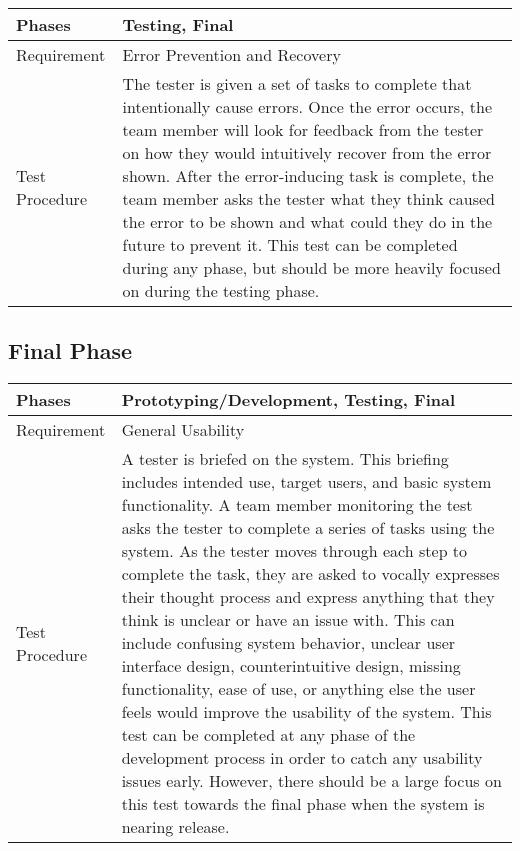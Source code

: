 \documentclass{article}
\begin{document}
\begin{tabular}{| l | p{12cm}  |}
    \hline
	Phases & Testing, Final \\ \hline
	Requirement & Error Prevention and Recovery \\ \hline
	Test Procedure & The tester is given a set of tasks to complete that
	intentionally cause errors. Once the error occurs, the team member will
	look for feedback from the tester on how they would intuitively recover
	from the error shown. After the error-inducing task is complete, the team
	member asks the tester what they think caused the error to be shown and
	what could they do in the future to prevent it. This test can be completed
	during any phase, but should be more heavily focused on during the testing
	phase. \\ \hline
\end{tabular}

\subsection{Final Phase}
\begin{tabular}{| l | p{12cm}  |}
    \hline
	Phases & Prototyping/Development, Testing, Final \\ \hline
	Requirement & General Usability \\ \hline
	Test Procedure & A tester is briefed on the system. This briefing includes
	intended use, target users, and basic system functionality. A team member
	monitoring the test asks the tester to complete a series of tasks using
	the system. As the tester moves through each step to complete the task,
	they are asked to vocally expresses their thought process and express
	anything that they think is unclear or have an issue with. This can
	include confusing system behavior, unclear user interface design,
	counterintuitive design, missing functionality, ease of use, or anything
	else the user feels would improve the usability of the system. This test
	can be completed at any phase of the development process in order to catch
	any usability issues early. However, there should be a large focus on this
	test towards the final phase when the system is nearing release. \\ \hline
\end{tabular}
\end{document}
